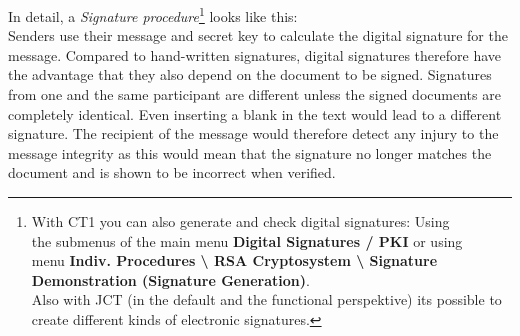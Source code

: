 In detail, a  {\em Signature procedure}\footnote{%
With CT1 you can also generate and check 
digital signatures: Using\\
the submenus of the main menu {\bf Digital Signatures / PKI}  or using\\
menu {\bf Indiv. Procedures \textbackslash{} RSA Cryptosystem 
\textbackslash{} Signature Demonstration (Signature Generation)}.\\
Also with JCT (in the default and the functional perspektive)
its possible to create different kinds of electronic signatures.
} looks like
this: \\ Senders use their message and secret key to calculate the digital
signature for the message. Compared to hand-written signatures, digital
signatures therefore have the advantage that they also depend on the document to
be signed. Signatures from one and the same participant are different unless the
signed documents are completely identical. Even inserting a blank in the text
would lead to a different signature. The recipient of the message would
therefore detect any injury to the message integrity as this would mean that the
signature no longer matches the document and is shown to be incorrect when
verified.

